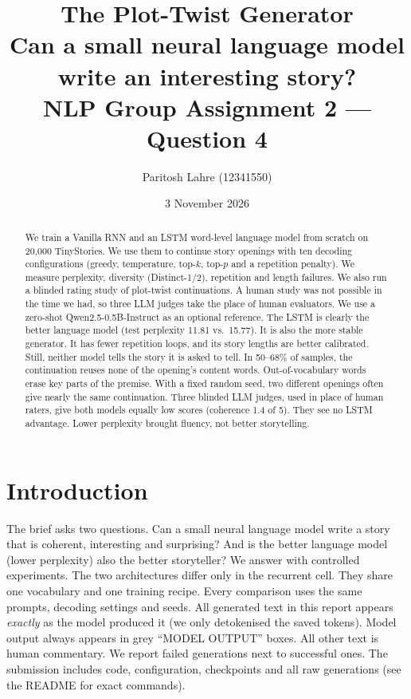 \documentclass[11pt,a4paper]{article}
\title{\textbf{The Plot-Twist Generator}\\[2pt]
\large Can a small neural language model write an interesting story?\\
\normalsize NLP Group Assignment 2 --- Question 4}
\author{Paritosh Lahre (12341550)}
\date{3 November 2026}
\begin{document}
\maketitle

\begin{abstract}
We train a Vanilla RNN and an LSTM word-level language model from scratch on 20,000 TinyStories.
We use them to continue story openings with ten decoding configurations (greedy, temperature,
top-$k$, top-$p$ and a repetition penalty). We measure perplexity, diversity (Distinct-1/2),
repetition and length failures. We also run a blinded rating study of plot-twist continuations.
A human study was not possible in the time we had, so three LLM judges take the place of human evaluators.
We use a zero-shot Qwen2.5-0.5B-Instruct as an optional reference. The LSTM is clearly the better language model (test perplexity 11.81 vs.\ 15.77). It is
also the more stable generator. It has fewer repetition loops, and its story lengths are better calibrated.
Still, neither model tells the story it is asked to tell. In 50--68\% of samples, the continuation
reuses none of the opening's content words. Out-of-vocabulary words erase key parts of the premise. With a fixed
random seed, two different openings often give nearly the same continuation. Three blinded LLM
judges, used in place of human raters, give both models equally low scores (coherence 1.4 of 5). They see no
LSTM advantage. Lower perplexity brought fluency, not better storytelling.
\end{abstract}

\section{Introduction}
The brief asks two questions. Can a small neural language model write a story that is coherent,
interesting and surprising? And is the better language model (lower perplexity) also the
better storyteller? We answer with controlled experiments. The two architectures differ only in
the recurrent cell. They share one vocabulary and one training recipe. Every comparison uses the same
prompts, decoding settings and seeds. All generated text in this report appears
\emph{exactly} as the model produced it (we only detokenised the saved tokens). Model output always appears in
grey ``MODEL OUTPUT'' boxes. All other text is human commentary. We report failed generations
next to successful ones. The submission includes code, configuration, checkpoints and all raw generations
(see the README for exact commands).
\end{document}
